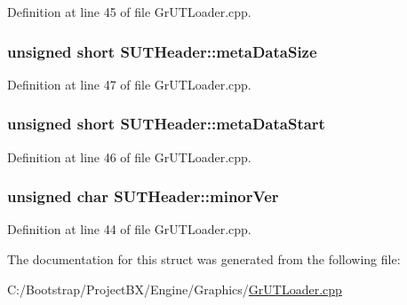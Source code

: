 Definition at line 45 of file GrUTLoader.cpp.\hypertarget{struct_s_u_t_header_8a505fd64fc60eeaff34a5c624ab1568}{
\subsubsection[{metaDataSize}]{\setlength{\rightskip}{0pt plus 5cm}unsigned short {\bf SUTHeader::metaDataSize}}}
\label{struct_s_u_t_header_8a505fd64fc60eeaff34a5c624ab1568}




Definition at line 47 of file GrUTLoader.cpp.\hypertarget{struct_s_u_t_header_4dd77cccfd65e78c6f9e151b2c45d885}{
\subsubsection[{metaDataStart}]{\setlength{\rightskip}{0pt plus 5cm}unsigned short {\bf SUTHeader::metaDataStart}}}
\label{struct_s_u_t_header_4dd77cccfd65e78c6f9e151b2c45d885}




Definition at line 46 of file GrUTLoader.cpp.\hypertarget{struct_s_u_t_header_972e18afc8d7c6b0f613c15c874b409e}{
\subsubsection[{minorVer}]{\setlength{\rightskip}{0pt plus 5cm}unsigned char {\bf SUTHeader::minorVer}}}
\label{struct_s_u_t_header_972e18afc8d7c6b0f613c15c874b409e}




Definition at line 44 of file GrUTLoader.cpp.

The documentation for this struct was generated from the following file:\begin{CompactItemize}
\item 
C:/Bootstrap/ProjectBX/Engine/Graphics/\hyperlink{_gr_u_t_loader_8cpp}{GrUTLoader.cpp}\end{CompactItemize}
